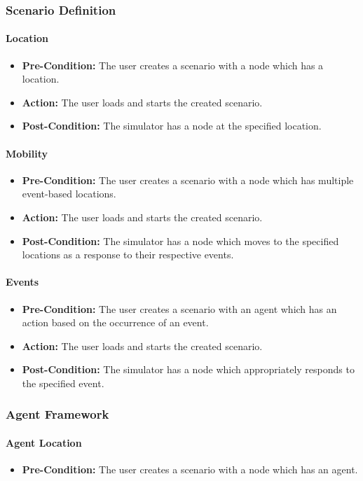\documentclass[titlepage]{article}
\newcommand{\testentry}[4]{
    \paragraph{#1}
    \begin{itemize}
        \item \textbf{Pre-Condition:} #2
        \item \textbf{Action:} #3
        \item \textbf{Post-Condition:} #4
    \end{itemize}
}
\begin{document}

\subsubsection{Scenario Definition}
    \testentry{Location}{
        The user creates a scenario with a node which has a location.
    }{
        The user loads and starts the created scenario.
    }{
        The simulator has a node at the specified location.
    }
    \testentry{Mobility}{
        The user creates a scenario with a node which has multiple event-based locations.
    }{
        The user loads and starts the created scenario.
    }{
        The simulator has a node which moves to the specified locations as a response to their respective events.
    }
    \testentry{Events}{
        The user creates a scenario with an agent which has an action based on the occurrence of an event.
    }{
        The user loads and starts the created scenario.
    }{
        The simulator has a node which appropriately responds to the specified event.
    }


\subsubsection{Agent Framework}
    \testentry{Agent Location}{
        The user creates a scenario with a node which has an agent.
    }{
        The user loads and starts the created scenario.
    }{
        The simulator executes the specified agent on the specified node.
    }
    \testentry{Startup}{
        The user creates a scenario with a node which has an agent and startup parameters.
    }{
        The user loads and starts the created scenario.
    }{
        The simulator executes the specified agent on the specified node and applies the startup parameters.
    }

\end{document}
